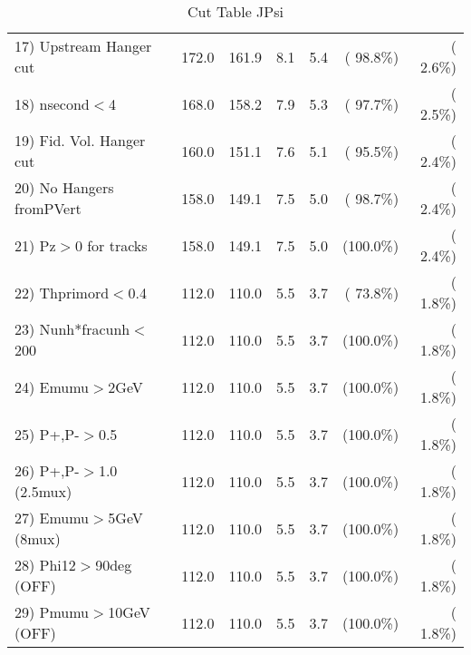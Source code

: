 \begin{table}[h!]
\begin{tabular}{||l||r|r|r|r|r|r||}
 17) Upstream Hanger cut  &        172.0 &        161.9 &          8.1 &          5.4 & ( 98.8\%) & (  2.6\%) \\
 18) nsecond$<$4          &        168.0 &        158.2 &          7.9 &          5.3 & ( 97.7\%) & (  2.5\%) \\
 19) Fid. Vol. Hanger cut &        160.0 &        151.1 &          7.6 &          5.1 & ( 95.5\%) & (  2.4\%) \\
 20) No Hangers fromPVert &        158.0 &        149.1 &          7.5 &          5.0 & ( 98.7\%) & (  2.4\%) \\
 21) Pz$>$0 for tracks    &        158.0 &        149.1 &          7.5 &          5.0 & (100.0\%) & (  2.4\%) \\
 22) Thprimord$<$0.4      &        112.0 &        110.0 &          5.5 &          3.7 & ( 73.8\%) & (  1.8\%) \\
 23) Nunh*fracunh$<$200   &        112.0 &        110.0 &          5.5 &          3.7 & (100.0\%) & (  1.8\%) \\
 24) Emumu$>$2GeV         &        112.0 &        110.0 &          5.5 &          3.7 & (100.0\%) & (  1.8\%) \\
 25) P+,P-$>$0.5          &        112.0 &        110.0 &          5.5 &          3.7 & (100.0\%) & (  1.8\%) \\
 26) P+,P-$>$1.0 (2.5mux) &        112.0 &        110.0 &          5.5 &          3.7 & (100.0\%) & (  1.8\%) \\
 27) Emumu$>$5GeV  (8mux) &        112.0 &        110.0 &          5.5 &          3.7 & (100.0\%) & (  1.8\%) \\
 28) Phi12$>$90deg  (OFF) &        112.0 &        110.0 &          5.5 &          3.7 & (100.0\%) & (  1.8\%) \\
 29) Pmumu$>$10GeV  (OFF) &        112.0 &        110.0 &          5.5 &          3.7 & (100.0\%) & (  1.8\%) \\
 \hline
 \hline
 \end{tabular}
 \caption{Cut Table  JPsi     }
 \label{tab-cutcohjpsi-mumu_cohrhop}
 \end{table}
